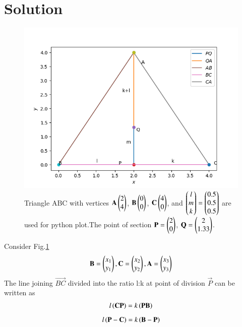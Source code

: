 \documentclass[journal,12pt,twocolumn]{IEEEtran}
\begin{document}
\section{Solution}
\begin{figure}[h!]
       \centering
        \includegraphics[width =\linewidth]{Figure_1.png}
        \caption{Triangle ABC with vertices $\mathbf{A}\begin{pmatrix}2\\4\end{pmatrix}$, $\mathbf{B}\begin{pmatrix}0\\0\end{pmatrix}$, $\mathbf{C}\begin{pmatrix}4\\0\end{pmatrix}$, and $\begin{pmatrix}l\\m\\k\end{pmatrix}=\begin{pmatrix}0.5\\0.5\\0.5\end{pmatrix}$ are used for python plot.The point of section $\mathbf{P}=\begin{pmatrix}2\\0\end{pmatrix}$, $\mathbf{Q}=\begin{pmatrix}2\\1.33\end{pmatrix}$.}\label{t1}
\end{figure}
Consider Fig.\ref{t1}
\begin{align}
    \mathbf{B}=\begin{pmatrix}x_1\\y_1\end{pmatrix},
    \mathbf{C}=\begin{pmatrix}x_2\\y_2\end{pmatrix},
     \mathbf{A}=\begin{pmatrix}x_3\\y_3\end{pmatrix}
\end{align}
The line joining  $\vec{BC}$ divided into the ratio l:k at point of division $\vec{P}$ can be written as
\begin{align}
    l\left(\mathbf{CP}\right)=k\left(\mathbf{PB}\right)
\end{align}
\begin{align}
    l\left(\mathbf{P-C}\right)=k\left(\mathbf{B-P}\right)
\end{align}
\end{document}
